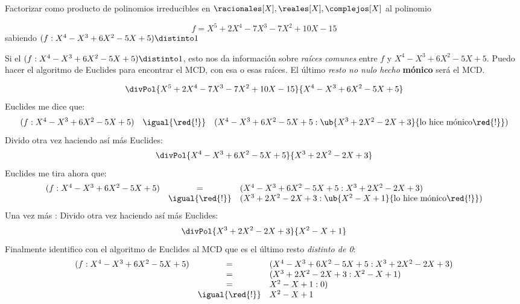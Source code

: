 \begin{enunciado}{\ejExtra}
  Factorizar como producto de polinomios irreducibles en
  $\racionales[X], \reales[X], \complejos[X]$ al polinomio

  $$
    f= X^5 + 2X^4 - 7X^3 - 7X^2 + 10X -15
  $$
  sabiendo $(f:X^4 - X^3 +6X^2  -5X +5) \distinto 1$

\end{enunciado}

Si el $(f:X^4 - X^3 +6X^2  -5X +5) \distinto 1$, esto nos da información
sobre \textit{raíces comunes} entre $f$ y $X^4 - X^3 +6X^2  -5X +5$. Puedo hacer el algoritmo de Euclides para encontrar el MCD, con esa
o esas raíces. El último \textit{resto no nulo hecho} \textbf{mónico} será el MCD.

\medskip

$$
  \divPol{X^5 + 2X^4 - 7X^3 - 7X^2 + 10X -15}{X^4 - X^3 +6X^2 - 5X +5}
$$
Euclides me dice que:
$$
  \begin{array}{rcl}
    (f : X^4 - X^3 +6X^2 - 5X +5) & \igual{\red{!}} & (X^4 - X^3 +6X^2 - 5X +5 : \ub{X^3 + 2X^2 - 2X + 3}{\text{lo hice mónico\red{!}}})
  \end{array}
$$
Divido otra vez haciendo así más Euclides:
$$
  \divPol{X^4 - X^3 +6X^2 - 5X +5}{X^3 + 2X^2 - 2X + 3}
$$
Euclides me tira ahora que:
$$
  \begin{array}{rcl}
    (f : X^4 - X^3 +6X^2 - 5X +5) & =               & (X^4 - X^3 +6X^2 - 5X +5 : X^3 + 2X^2 - 2X + 3)                        \\
                                  & \igual{\red{!}} & (X^3 + 2X^2 - 2X + 3 : \ub{X^2 - X + 1}{\text{lo hice mónico\red{!}}})
  \end{array}
$$
Una vez más \rollingEyes:
Divido otra vez haciendo así más Euclides:
$$
  \divPol{X^3 + 2X^2 - 2X + 3}{X^2 - X + 1}
$$
Finalmente identifico con el algoritmo de Euclides al MCD que es el último resto \textit{distinto de 0}:
$$
  \begin{array}{rcl}
    (f : X^4 - X^3 +6X^2 - 5X +5) & =               & (X^4 - X^3 +6X^2 - 5X +5 : X^3 + 2X^2 - 2X + 3) \\
                                  & =               & (X^3 + 2X^2 - 2X + 3 : X^2 - X + 1)             \\
                                  & =               & X^2 - X + 1 : 0)                                \\
                                  & \igual{\red{!}} & X^2 - X + 1
  \end{array}
$$

